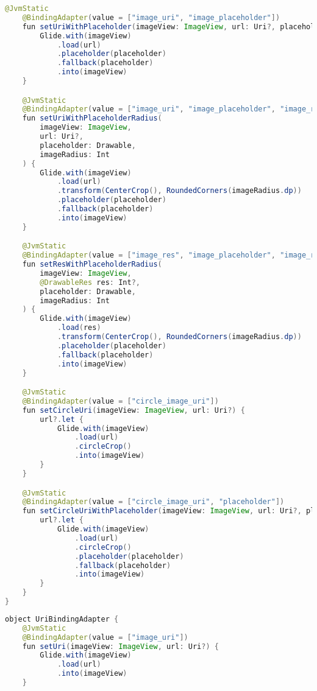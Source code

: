 \begin{asection}
\begin{lstlisting}[language=Java,label={lst:add:a_8}, caption={UriBindingAdapter}]
    @JvmStatic
    @BindingAdapter(value = ["image_uri", "image_placeholder"])
    fun setUriWithPlaceholder(imageView: ImageView, url: Uri?, placeholder: Drawable) {
        Glide.with(imageView)
            .load(url)
            .placeholder(placeholder)
            .fallback(placeholder)
            .into(imageView)
    }

    @JvmStatic
    @BindingAdapter(value = ["image_uri", "image_placeholder", "image_radius"])
    fun setUriWithPlaceholderRadius(
        imageView: ImageView,
        url: Uri?,
        placeholder: Drawable,
        imageRadius: Int
    ) {
        Glide.with(imageView)
            .load(url)
            .transform(CenterCrop(), RoundedCorners(imageRadius.dp))
            .placeholder(placeholder)
            .fallback(placeholder)
            .into(imageView)
    }

    @JvmStatic
    @BindingAdapter(value = ["image_res", "image_placeholder", "image_radius"])
    fun setResWithPlaceholderRadius(
        imageView: ImageView,
        @DrawableRes res: Int?,
        placeholder: Drawable,
        imageRadius: Int
    ) {
        Glide.with(imageView)
            .load(res)
            .transform(CenterCrop(), RoundedCorners(imageRadius.dp))
            .placeholder(placeholder)
            .fallback(placeholder)
            .into(imageView)
    }

    @JvmStatic
    @BindingAdapter(value = ["circle_image_uri"])
    fun setCircleUri(imageView: ImageView, url: Uri?) {
        url?.let {
            Glide.with(imageView)
                .load(url)
                .circleCrop()
                .into(imageView)
        }
    }

    @JvmStatic
    @BindingAdapter(value = ["circle_image_uri", "placeholder"])
    fun setCircleUriWithPlaceholder(imageView: ImageView, url: Uri?, placeholder: Drawable) {
        url?.let {
            Glide.with(imageView)
                .load(url)
                .circleCrop()
                .placeholder(placeholder)
                .fallback(placeholder)
                .into(imageView)
        }
    }
}
\end{lstlisting}
\hfill \break
\begin{lstlisting}[language=Java,label={lst:add:a_9}, caption={AhriMessagingService}, caption={PreferenceDataSource}]
object UriBindingAdapter {
    @JvmStatic
    @BindingAdapter(value = ["image_uri"])
    fun setUri(imageView: ImageView, url: Uri?) {
        Glide.with(imageView)
            .load(url)
            .into(imageView)
    }


\end{lstlisting}
\end{asection}
